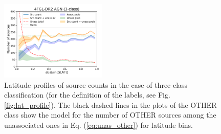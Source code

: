 \documentclass[referee]{aa} %
\begin{document}
\begin{figure}[h]
\includegraphics[width=0.45\textwidth]{plots/lat_profile_AGN_4FGL-DR2_3classes.pdf}
\caption{Latitude profiles of source counts in the case of three-class classification (for the definition of the labels, see Fig. \ref{fig:lat_profile}).
The black dashed lines in the plots of the OTHER class show the model for the number of OTHER sources among the unassociated ones
in Eq. (\ref{eq:unas_other}) for latitude bins.}
\label{fig:lat_profile_3class}
\end{figure}
\end{document}

